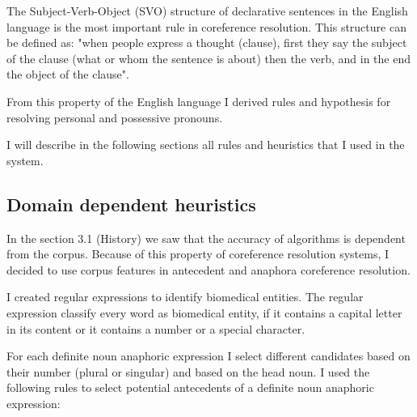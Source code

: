 The Subject-Verb-Object (SVO) structure of declarative sentences in the English language is the most important rule in coreference resolution. This structure can be defined as: "when people express a thought (clause), first they say the subject of the clause (what or whom the sentence is about) then the verb, and in the end the object of the clause".
 
From this property of the English language I derived rules and hypothesis for resolving personal and possessive pronouns. 

I will describe in the following sections  all rules and heuristics that I used in the system.

\subsection{Domain dependent heuristics}
In the section 3.1 (History) we saw that the accuracy of algorithms is dependent from the corpus. Because of this property of coreference resolution systems, I decided to use corpus features in antecedent and anaphora coreference resolution.

I created regular expressions to identify biomedical entities. The regular expression classify every word as biomedical entity, if it contains a capital letter in its content or it contains a number or a special character.

For each definite noun anaphoric expression I select different candidates based on their number (plural or singular) and based on the head noun. I used the following rules to select potential antecedents of a definite noun anaphoric expression:
 
